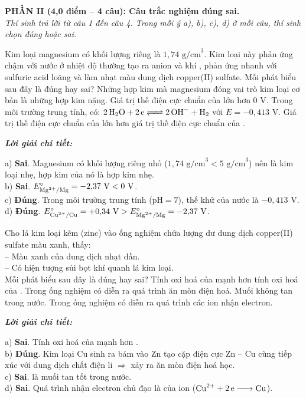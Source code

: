 \documentclass[11pt,a4paper]{article}
\def\loigiai#1{
\par\begingroup\color{blue!80!black}\small
\noindent\textbf{\textit{Lời giải chi tiết:}}\par
#1\par\endgroup}
\begin{document}
\noindent
\textbf{PHẦN II (4,0 điểm -- 4 câu): Câu trắc nghiệm đúng sai.}\\
\textit{Thí sinh trả lời từ câu 1 đến câu 4. Trong mỗi ý a), b), c), d) ở mỗi câu, thí sinh chọn đúng hoặc sai.}

\setcounter{ex}{0}

\begin{ex}
Kim loại magnesium có khối lượng riêng là $1{,}74\text{ g/cm}^3$. Kim loại này phản ứng chậm với nước ở nhiệt độ thường tạo ra anion  và khí , phản ứng nhanh với sulfuric acid loãng và làm nhạt màu dung dịch copper(II) sulfate. Mỗi phát biểu sau đây là đúng hay sai?
\choiceTF
{Những hợp kim mà magnesium đóng vai trò kim loại cơ bản là những hợp kim nặng.}
{Giá trị thế điện cực chuẩn của  lớn hơn 0 V.}
{\True Trong môi trường trung tính, có: $\ce{2H2O + 2e <=> 2OH- + H2}$ với $E = -0{,}413\text{ V}$.}
{\True Giá trị thế điện cực chuẩn của  lớn hơn giá trị thế điện cực chuẩn của .}
\loigiai{
a) \textbf{Sai}. Magnesium có khối lượng riêng nhỏ ($1{,}74\text{ g/cm}^3 < 5\text{ g/cm}^3$) nên là kim loại nhẹ, hợp kim của nó là hợp kim nhẹ.\\
b) \textbf{Sai}. $E^\circ_{\ce{Mg^2+/Mg}} = -2{,}37\text{ V} < 0\text{ V}$.\\
c) \textbf{Đúng}. Trong môi trường trung tính ($\text{pH} = 7$), thế khử của nước là $-0{,}413\text{ V}$.\\
d) \textbf{Đúng}. $E^\circ_{\ce{Cu^2+/Cu}} = +0{,}34\text{ V} > E^\circ_{\ce{Mg^2+/Mg}} = -2{,}37\text{ V}$.}
\end{ex}

\begin{ex}
Cho lá kim loại kẽm (zinc) vào ống nghiệm chứa lượng dư dung dịch copper(II) sulfate màu xanh, thấy:\\
-- Màu xanh của dung dịch nhạt dần.\\
-- Có hiện tượng sủi bọt khí quanh lá kim loại.\\
Mỗi phát biểu sau đây là đúng hay sai?
\choiceTF
{Tính oxi hoá của  mạnh hơn tính oxi hoá của .}
{\True Trong ống nghiệm có diễn ra quá trình ăn mòn điện hoá.}
{Muối  không tan trong nước.}
{Trong ống nghiệm có diễn ra quá trình các ion  nhận electron.}
\loigiai{
a) \textbf{Sai}. Tính oxi hoá của  mạnh hơn \ce{Zn^2+}.\\
b) \textbf{Đúng}. Kim loại Cu sinh ra bám vào Zn tạo cặp điện cực Zn -- Cu cùng tiếp xúc với dung dịch chất điện li $\Rightarrow$ xảy ra ăn mòn điện hoá học.\\
c) \textbf{Sai}. \ce{ZnSO4} là muối tan tốt trong nước.\\
d) \textbf{Sai}. Quá trình nhận electron chủ đạo là của ion \ce{Cu^2+} ($\ce{Cu^2+ + 2e -> Cu}$).}
\end{ex}
\end{document}
